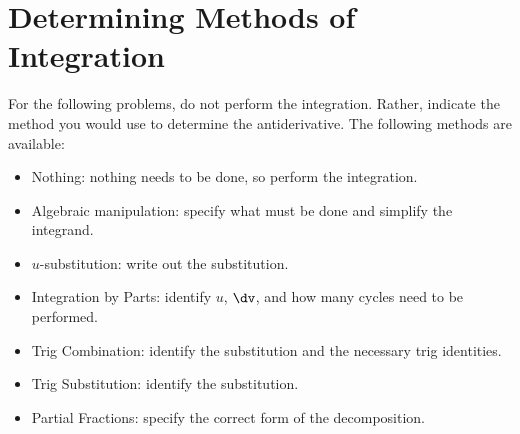\documentclass{hw}
\begin{document}
\section*{Determining Methods of Integration}
For the following problems, do not perform the integration. Rather, indicate the method you would
use to determine the antiderivative. The following methods are available:
\begin{itemize}
\item Nothing: nothing needs to be done, so perform the integration.
\item Algebraic manipulation: specify what must be done and simplify the integrand.
\item $u$-substitution: write out the substitution.
\item Integration by Parts: identify $u$, $\dv$, and how many cycles need to be performed.
\item Trig Combination: identify the substitution and the necessary trig identities.
\item Trig Substitution: identify the substitution.
\item Partial Fractions: specify the correct form of the decomposition.
\end{itemize}
\end{document}
